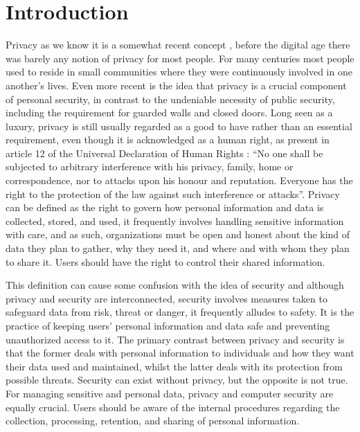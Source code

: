 %
%

%
\section{Introduction}

Privacy as we know it is a somewhat recent concept \cite{vincent2016privacy, moore2017privacy},
before the digital age there was barely any notion of privacy for most
people. For many centuries most people used to reside in small communities
where they were continuously involved in one another's lives. Even more
recent is the idea that privacy is a crucial component of personal security,
in contrast to the undeniable necessity of public security, including the
requirement for guarded walls and closed doors. Long seen as a luxury, privacy
is still usually regarded as a good to have rather than an essential
requirement, even though it is acknowledged as a human right, as present
in article 12 of the Universal Declaration of Human Rights \cite{RooseveltUniversal}:
``No one shall be subjected to arbitrary interference with his privacy,
family, home or correspondence, nor to attacks upon his honour and reputation.
Everyone has the right to the protection of the law against such interference
or attacks''. Privacy can be defined \cite{InternationalWhat, SpiekermannEngineering}
as the right to govern how personal information and data is collected, stored,
and used, it frequently involves handling sensitive information with care,
and as such, organizations must be open and honest about the kind of data
they plan to gather, why they need it, and where and with whom they plan
to share it. Users should have the right to control their shared information.

This definition can cause some confusion with the idea of security \cite{HIVDifference}
and although privacy and security are interconnected, security involves
measures taken to safeguard data from risk, threat or danger, it frequently
alludes to safety. It is the practice of keeping users' personal information
and data safe and preventing unauthorized access to it. The primary contrast
between privacy and security is that the former deals with personal information
to individuals and how they want their data used and maintained, whilst
the latter deals with its protection from possible threats. Security can
exist without privacy, but the opposite is not true. For managing sensitive
and personal data, privacy and computer security are equally crucial. Users
should be aware of the internal procedures regarding the collection, processing,
retention, and sharing of personal information.

